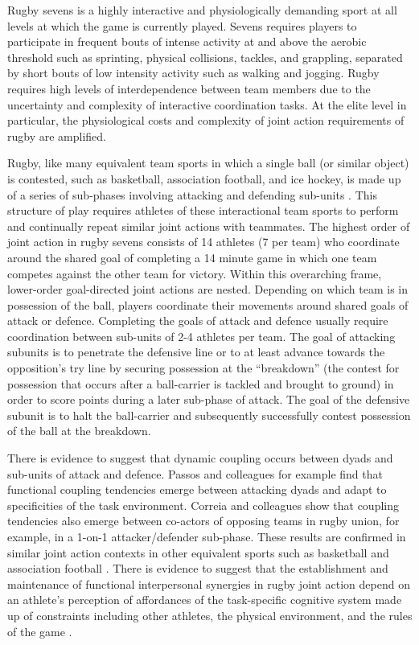   Rugby sevens is a highly interactive and physiologically demanding sport at all levels at which the game is currently played. Sevens requires players to participate in frequent bouts of intense activity at and above the aerobic threshold such as sprinting, physical collisions, tackles, and grappling, separated by short bouts of low intensity activity such as walking and jogging. Rugby requires high levels of interdependence between team members due to the uncertainty and complexity of interactive coordination tasks.  At the elite level in particular, the physiological costs and complexity of joint action requirements of rugby are amplified.


  Rugby, like many equivalent team sports in which a single ball (or similar object) is contested, such as basketball, association football, and ice hockey, is made up of a series of sub-phases involving attacking and defending sub-units \citep{Passos2011}. This structure of play requires athletes of these interactional team sports to perform and continually repeat similar joint actions with teammates.   The highest order of joint action in rugby sevens consists of 14 athletes (7 per team) who coordinate around the shared goal of completing a 14 minute game in which one team competes against the other team for victory.  Within this overarching frame, lower-order goal-directed joint actions are nested.  Depending on which team is in possession of the ball, players coordinate their movements around shared goals of attack or defence.  Completing the goals of attack and defence usually require coordination between sub-units of 2-4 athletes per team.  The goal of attacking subunits is to penetrate the defensive line or to at least advance towards the opposition's try line by securing possession at the ``breakdown'' (the contest for possession that occurs after a ball-carrier is tackled and brought to ground) in order to score points during a later sub-phase of attack.  The goal of the defensive subunit is to halt the ball-carrier and subsequently successfully contest possession of the ball at the breakdown.

  There is evidence to suggest that dynamic coupling occurs between dyads and sub-units of attack and defence\citep{Passos2011,Correia2014}.  Passos and colleagues \textcite{Passos2011} for example find that functional coupling tendencies emerge between attacking dyads and adapt to specificities of the task environment.  Correia and colleagues \textcite{Correia2014} show that coupling tendencies also emerge between co-actors of opposing teams in rugby union, for example, in a 1-on-1 attacker/defender sub-phase.  These results are confirmed in similar joint action contexts in other equivalent sports such as basketball and association football \citep{Duarte2013}. There is evidence to suggest that the establishment and maintenance of functional  interpersonal synergies in rugby joint action depend on an athlete's perception of affordances of the task-specific cognitive system made up of constraints including other athletes, the physical environment, and the rules of the game \citep{Passos2012}.

